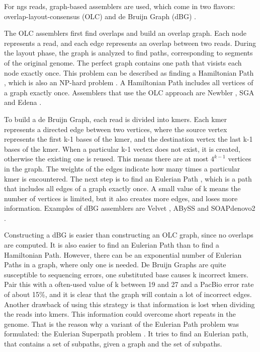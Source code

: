 \documentclass[../main/thesis.tex]{subfiles}
\begin{document}
For ngs reads, graph-based assemblers are used, which come in two flavors: overlap-layout-consensus (OLC) and de Bruijn Graph (dBG) \cite{OLC_DBG}.

The OLC assemblers first find overlaps and build an overlap graph.
Each node represents a read, and each edge represents an overlap between two reads.
During the layout phase, the graph is analyzed to find paths, corresponding to segments of the original genome.
The perfect graph contains one path that visists each node exactly once.
This problem can be described as finding a Hamiltonian Path \cite{Euler_Hamil_paths}, which is also an NP-hard problem \cite{ngs_difficulties}.
A Hamiltonian Path includes all vertices of a graph exactly once.
Assemblers that use the OLC approach are Newbler \cite{newbler}, SGA \cite{sga} and Edena \cite{edena}.


To build a de Bruijn Graph, each read is divided into kmers.
Each kmer represents a directed edge between two vertices, where the source vertex represents the first k-1 bases of the kmer, and the destination vertex the last k-1 bases of the kmer.
When a particular k-1 vectex does not exist, it is created, otherwise the existing one is reused.
This means there are at most $4^{k-1}$ vertices in the graph.
The weights of the edges indicate how many times a particular kmer is encountered.
The next step is to find an Eulerian Path \cite{Euler_Hamil_paths}, which is a path that includes all edges of a graph exactly once.
A small value of k means the number of vertices is limited, but it also creates more edges, and loses more information.
Examples of dBG assemblers are Velvet \cite{velvet}, ABySS \cite{abyss} and SOAPdenovo2 \cite{soapdenovo2}.

Constructing a dBG is easier than constructing an OLC graph, since no overlaps are computed.
It is also easier to find an Eulerian Path than to find a Hamiltonian Path.
However, there can be an exponential number of Eulerian Paths in a graph, where only one is needed.
De Bruijn Graphs are quite susceptible to sequencing errors, one substituted base causes k incorrect kmers.
Pair this with a often-used value of k between 19 and 27 and a PacBio error rate of about 15\%, and it is clear that the graph will contain a lot of incorrect edges.
Another drawback of using this strategy is that information is lost when dividing the reads into kmers.
This information could overcome short repeats in the genome.
That is the reason why a variant of the Eulerian Path problem was formulated: the Eulerian Superpath problem \cite{Eulerian_Superpath}.
It tries to find an Eulerian path, that contains a set of subpaths, given a graph and the set of subpaths.
\end{document}
